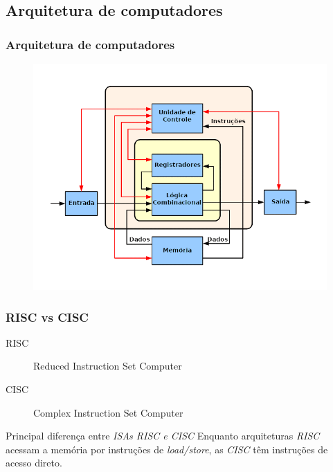 \documentclass[aspectratio=169]{beamer}
\begin{document}
    \subsection{Arquitetura de computadores}
    \begin{frame}
        \frametitle{Arquitetura de computadores}
        \vfill
        \begin{figure}[H]
        \centering
            \includegraphics[width=.9\textwidth,height=.9\textheight,keepaspectratio]
            {../images/ABasicComputer.png}
        \end{figure}
        \vfill
    \end{frame}

    \begin{frame}
        \frametitle{RISC vs CISC}
        \vfill
        \begin{description}
            \item[RISC] Reduced Instruction Set Computer
            \item[CISC] Complex Instruction Set Computer
        \end{description}
        \vfill
        \begin{block}{Principal diferença entre \textit{ISAs RISC e CISC}}
        {Enquanto arquiteturas \textit{RISC} acessam a memória por instruções de
            \textit{load/store}, as \textit{CISC} têm instruções de acesso direto.
        }
        \end{block}
        \vfill
    \end{frame}
\end{document}
